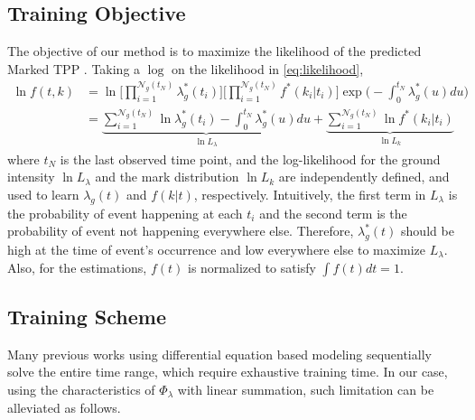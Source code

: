 \subsection{Training Objective \label{sec:obj}}
The objective of our method is to maximize the likelihood of the predicted Marked TPP \cite{bib:daley}. 
Taking a $\log$ on the likelihood in \eqref{eq:likelihood}, 
\begin{equation}
\begin{aligned}
\ln f(t,k) &= \ln  \bigg[\prod ^{\mathcal{N}_g(t_N)} _{i=1} \lambda ^* _g (t_i)\bigg]\bigg[\prod ^{\mathcal{N}_g(t_N)} _{i=1} f ^* (k_i | t_i) \bigg] \exp \bigg( - \int ^{t_N} _0 \lambda ^*_g (u) du \bigg) \\
 &= \underbrace{\sum ^{\mathcal{N}_g(t_N)} _{i=1} \ln \lambda ^* _g (t_i) -   \int ^{t_N} _0 \lambda ^*_g (u) du}_{\ln L_\lambda} + \underbrace{\sum ^{\mathcal{N}_g(t_N)} _{i=1} \ln f ^* (k_i | t_i)}_{\ln L_k}
\label{eq:obj}
\end{aligned}
\end{equation}
where $t_N$ is the last observed time point, and the log-likelihood for the ground intensity $\ln L_\lambda$ and the mark distribution $\ln L_k$ are independently defined,
and used to learn $\lambda_g(t)$ and $f(k|t)$, respectively.
Intuitively, the first term in $L_\lambda$ is the probability of event happening at each $t_i$ and the second term is the probability of event not happening everywhere else. 
Therefore, $\lambda^*_g(t)$ should be high at the time of event's occurrence and low everywhere else to maximize $L_\lambda$.
Also, for the estimations, $f(t)$ is normalized to satisfy $\int f(t) dt = 1$.

\subsection{Training Scheme \label{train_parallel}}
Many previous works using differential equation based modeling \cite{bib:NJSDE, bib:STPP} 
sequentially solve the entire time range, which require  
exhaustive training time. 
In our case, using the characteristics of $\Phi_\lambda$ with linear summation, such limitation can be alleviated as follows. 

